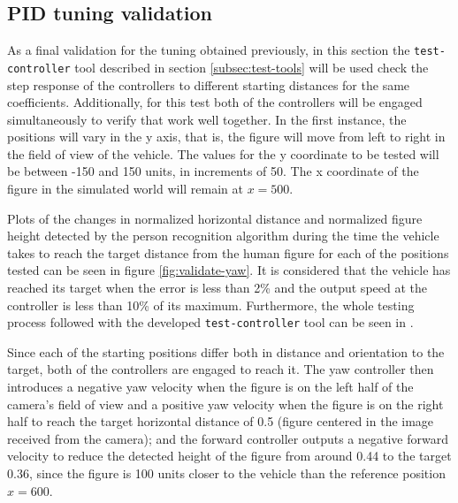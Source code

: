 \subsection{PID tuning validation}
\label{subsec:pid-test-controller}

As a final validation for the tuning obtained previously, in this section the \texttt{test-controller} tool described in section \ref{subsec:test-tools} will be used check the step response of the controllers to different starting distances for the same coefficients.
Additionally, for this test both of the controllers will be engaged simultaneously to verify that work well together.
In the first instance, the positions will vary in the y axis, that is, the figure will move from left to right in the field of view of the vehicle.
The values for the y coordinate to be tested will be between -150 and 150 units, in increments of 50.
The x coordinate of the figure in the simulated world will remain at $x=500$.

Plots of the changes in normalized horizontal distance and normalized figure height detected by the person recognition algorithm during the time the vehicle takes to reach the target distance from the human figure for each of the positions tested can be seen in figure \ref{fig:validate-yaw}.
It is considered that the vehicle has reached its target when the error is less than 2\% and the output speed at the controller is less than 10\% of its maximum.
Furthermore, the whole testing process followed with the developed \texttt{test-controller} tool can be seen in .

Since each of the starting positions differ both in distance and orientation to the target, both of the controllers are engaged to reach it.
The yaw controller then introduces a negative yaw velocity when the figure is on the left half of the camera's field of view and a positive yaw velocity when the figure is on the right half to reach the target horizontal distance of 0.5 (figure centered in the image received from the camera);
and the forward controller outputs a negative forward velocity to reduce the detected height of the figure from around 0.44 to the target 0.36, since the figure is 100 units closer to the vehicle than the reference position $x=600$.

